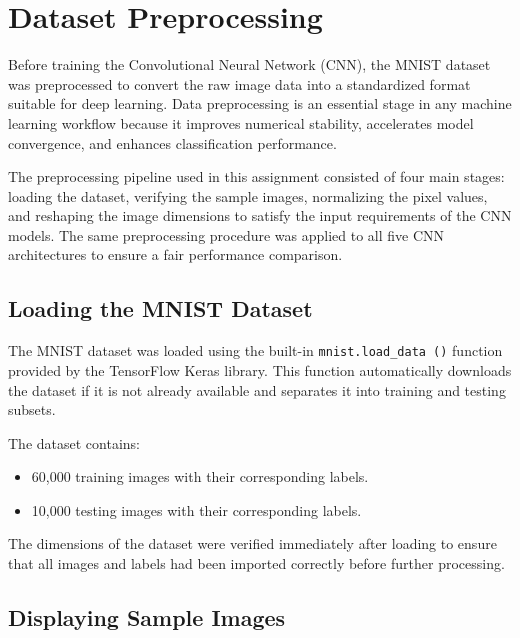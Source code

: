 
\section{Dataset Preprocessing}

Before training the Convolutional Neural Network (CNN), the MNIST dataset was preprocessed to convert the raw image data into a standardized format suitable for deep learning. Data preprocessing is an essential stage in any machine learning workflow because it improves numerical stability, accelerates model convergence, and enhances classification performance\cite{goodfellow2016deep,geron2023}.

The preprocessing pipeline used in this assignment consisted of four main stages: loading the dataset, verifying the sample images, normalizing the pixel values, and reshaping the image dimensions to satisfy the input requirements of the CNN models. The same preprocessing procedure was applied to all five CNN architectures to ensure a fair performance comparison.

\subsection{Loading the MNIST Dataset}

The MNIST dataset was loaded using the built-in \texttt{mnist.load\_data ()} function provided by the TensorFlow Keras library. This function automatically downloads the dataset if it is not already available and separates it into training and testing subsets.

The dataset contains:

\begin{itemize}
    \item 60,000 training images with their corresponding labels.
    \item 10,000 testing images with their corresponding labels.
\end{itemize}

The dimensions of the dataset were verified immediately after loading to ensure that all images and labels had been imported correctly before further processing\cite{tensorflow2015}.

\subsection{Displaying Sample Images}

